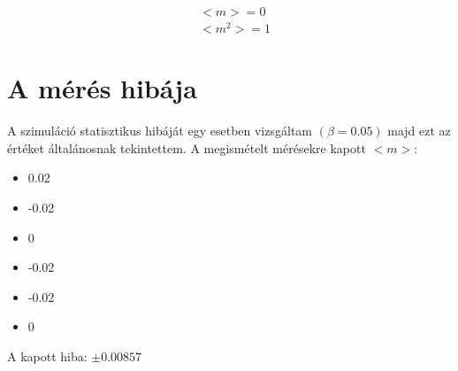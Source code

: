 \documentclass[paper=a4, fontsize=11pt]{article}
\begin{document}
\begin{align}
&<m>=0\\
&<m^2>=1
\end{align}


\newpage
\section{A mérés hibája}
A szimuláció statisztikus hibáját egy esetben vizsgáltam $(\beta=0.05)$ majd ezt az értéket általánosnak tekintettem.
\newline
A megismételt mérésekre kapott $<m>$:
\begin{itemize}
  \item 0.02
  \item -0.02
  \item 0
  \item -0.02
  \item -0.02
  \item 0
\end{itemize}

A kapott hiba: $\pm 0.00857$
\end{document}
